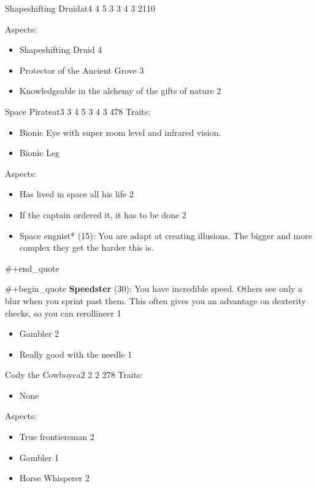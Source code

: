 \documentclass[11pt]{article}
\begin{document}
{\begin{npc}{Shapeshifting Druid}{at}{4 4 5 3 3 4 3 2}{110}
\columnbreak

Aspects:
\begin{itemize}
\item Shapeshifting Druid 4
\item Protector of the Ancient Grove 3
\item Knowledgeable in the alchemy of the gifts of nature 2
\end{itemize}
\end{npc}

\begin{npc}{Space Pirate}{at}{3 3 4 5 3 4 3 4}{78}
Traits:
\begin{itemize}
\item Bionic Eye with super zoom level and infrared vision.
\item Bionic Leg
\end{itemize}

\columnbreak

Aspects:
\begin{itemize}
\item Has lived in space all his life 2
\item If the captain ordered it, it has to be done 2
\item Space engnist* (15): You are adapt at creating illusions. The bigger and more complex they get the harder this is.
\end{itemize}
\#+end\_quote

\#+begin\_quote
\textbf{Speedster} (30): You have incredible speed. Others see only a blur when you sprint past them. This often gives you an advantage on dexterity checks, so you can rerollineer 1
\begin{itemize}
\item Gambler 2
\item Really good with the needle 1
\end{itemize}
\end{npc}


\begin{npc}{Cody the Cowboy}{ca}{2 2 2 2}{78}
Traits:
\begin{itemize}
\item None
\end{itemize}

\columnbreak

Aspects:
\begin{itemize}
\item True frontiersman 2
\item Gambler 1
\item Horse Whisperer 2
\end{itemize}
\end{npc}
}
\end{document}
